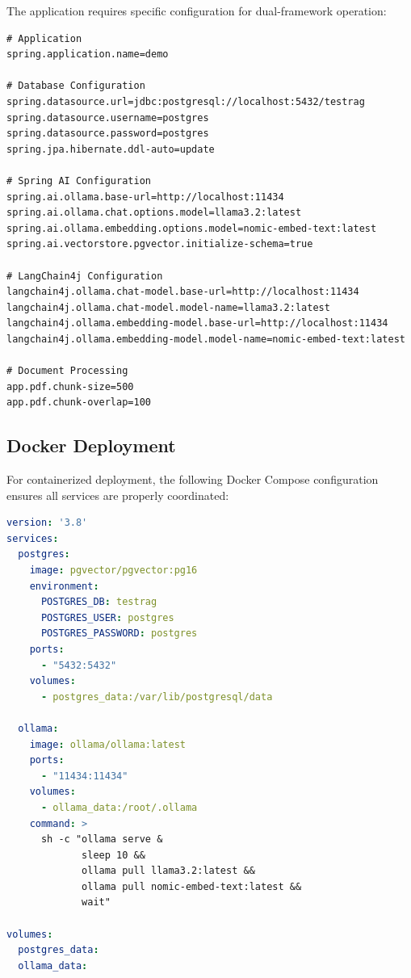 \documentclass[12pt,a4paper]{article}
\begin{document}
The application requires specific configuration for dual-framework operation:

\begin{lstlisting}[caption=application.properties - Complete Configuration]
# Application
spring.application.name=demo

# Database Configuration  
spring.datasource.url=jdbc:postgresql://localhost:5432/testrag
spring.datasource.username=postgres
spring.datasource.password=postgres
spring.jpa.hibernate.ddl-auto=update

# Spring AI Configuration
spring.ai.ollama.base-url=http://localhost:11434
spring.ai.ollama.chat.options.model=llama3.2:latest
spring.ai.ollama.embedding.options.model=nomic-embed-text:latest
spring.ai.vectorstore.pgvector.initialize-schema=true

# LangChain4j Configuration
langchain4j.ollama.chat-model.base-url=http://localhost:11434
langchain4j.ollama.chat-model.model-name=llama3.2:latest
langchain4j.ollama.embedding-model.base-url=http://localhost:11434
langchain4j.ollama.embedding-model.model-name=nomic-embed-text:latest

# Document Processing
app.pdf.chunk-size=500
app.pdf.chunk-overlap=100
\end{lstlisting}

\subsection{Docker Deployment}

For containerized deployment, the following Docker Compose configuration ensures all services are properly coordinated:

\begin{lstlisting}[language=yaml, caption=docker-compose.yml]
version: '3.8'
services:
  postgres:
    image: pgvector/pgvector:pg16
    environment:
      POSTGRES_DB: testrag
      POSTGRES_USER: postgres  
      POSTGRES_PASSWORD: postgres
    ports:
      - "5432:5432"
    volumes:
      - postgres_data:/var/lib/postgresql/data
      
  ollama:
    image: ollama/ollama:latest
    ports:
      - "11434:11434"
    volumes:
      - ollama_data:/root/.ollama
    command: >
      sh -c "ollama serve & 
             sleep 10 && 
             ollama pull llama3.2:latest &&
             ollama pull nomic-embed-text:latest &&
             wait"

volumes:
  postgres_data:
  ollama_data:
\end{lstlisting}
\end{document}
